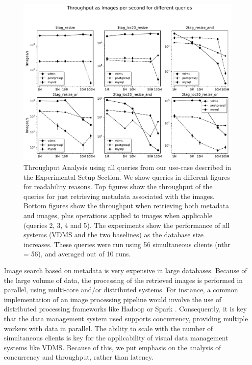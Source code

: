 \begin{figure}[ht]
\includegraphics[width=\textwidth]{figures/plot_56_mosaic_results_throughput}
\caption{Throughput Analysis using all queries from our use-case
described in the Experimental Setup Section.
We show queries in different figures for readability reasons.
Top figures show the throughput of the queries for
just retrieving metadata associated with the images.
Bottom figures show the throughput when retrieving both metadata and images,
plus operations applied to images when applicable (queries 2, 3, 4 and 5).
The experiments show the performance of all systems (VDMS and the two baselines) as the
database size increases.
These queries were run using 56 simultaneous clients (nthr = 56),
and averaged out of 10 runs.}
\label{fig:q_throughput_56}
\end{figure}

Image search based on metadata is very expensive in large databases.
Because of the large volume of data, the processing of the retrieved images
is performed in parallel, using multi-core and/or distributed systems.
For instance, a common implementation of an image processing pipeline
would involve the use of distributed processing frameworks
like Hadoop \cite{hadoop} or Spark \cite{spark}.
Consequently, it is key that the data management system used supports
concurrency, providing multiple workers with data in parallel.
The ability to scale with the number of simultaneous clients is key for the
applicability of visual data management systems like VDMS.
Because of this, we put emphasis on the analysis of concurrency and throughput,
rather than latency.

